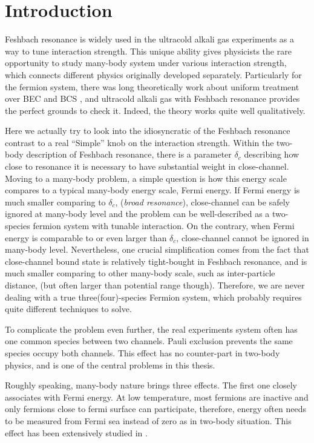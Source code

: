 
\chapter{Introduction}
Feshbach resonance is widely used in the ultracold alkali gas experiments as a way to tune interaction strength.  This unique ability gives physicists the rare opportunity to study  many-body system under various interaction strength, which connects different physics originally developed separately.  Particularly for the fermion system, there was long theoretically work about uniform treatment over BEC and BCS \cite{Eagle,LeggettCrossover,Nozieres,RanderiaBEC}, and ultracold alkali gas with Feshbach resonance provides the perfect grounds to check it.  Indeed,  the theory works quite well  qualitatively.  

Here we actually try to look into the idiosyncratic of the Feshbach resonance contrast to a real ``Simple'' knob on the interaction strength.  Within the two-body description of Feshbach resonance, there is a parameter $\delta_c$ describing how close to resonance it is necessary to have substantial weight in close-channel.  Moving to a many-body problem, a simple question is how this energy scale compares to a typical many-body energy scale, Fermi energy.  If Fermi energy is much smaller comparing to $\delta_c$, (\emph{broad resonance}), close-channel can be safely ignored at many-body level and the problem can be well-described as a two-species fermion system with tunable interaction.  On the contrary, when Fermi energy is  comparable to or even larger than $\delta_c$, close-channel cannot be ignored in many-body level.  Nevertheless, one crucial simplification comes from  the fact that close-channel bound state is relatively tight-bought in  Feshbach resonance, and is much smaller comparing to other many-body scale, such as inter-particle distance, (but often larger than potential range though).  Therefore, we are never dealing with a true three(four)-species Fermion system, which probably requires quite different techniques to solve.

To complicate the problem even further, the real experiments system often has one common species between two channels.  Pauli exclusion prevents the same species occupy both channels.  This effect has no counter-part in two-body physics, and is one of the central problems in this thesis. 

Roughly speaking, many-body nature brings three effects.  The first one closely associates with Fermi energy.  At low temperature, most fermions are inactive and only fermions close to fermi surface can participate, therefore, energy often needs to be measured from Fermi sea instead of zero as in two-body situation.  This effect has been extensively studied in \cite{GurarieNarrow}.

